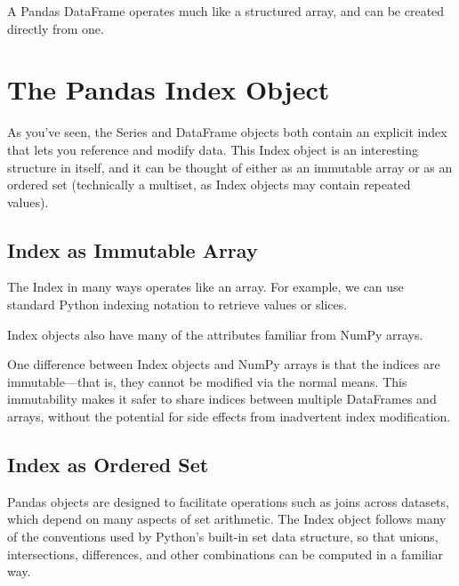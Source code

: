 A Pandas DataFrame operates much like
a structured array, and can be created directly from one.


\section{The Pandas Index Object}
As you've seen, the Series and DataFrame objects both contain an explicit index that
lets you reference and modify data. This Index object is an interesting structure in
itself, and it can be thought of either as an immutable array or as an ordered set (technically a multiset, as Index objects may contain repeated values).

\subsection*{Index as Immutable Array}
The Index in many ways operates like an array. For example, we can use standard
Python indexing notation to retrieve values or slices.

Index objects also have many of the attributes familiar from NumPy arrays.

One difference between Index objects and NumPy arrays is that the indices are
immutable—that is, they cannot be modified via the normal means. This immutability makes it safer to share indices between multiple DataFrames and
arrays, without the potential for side effects from inadvertent index modification.

\subsection*{Index as Ordered Set}
Pandas objects are designed to facilitate operations such as joins across datasets,
which depend on many aspects of set arithmetic. The Index object follows many of
the conventions used by Python's built-in set data structure, so that unions, intersections, differences, and other combinations can be computed in a familiar way.

